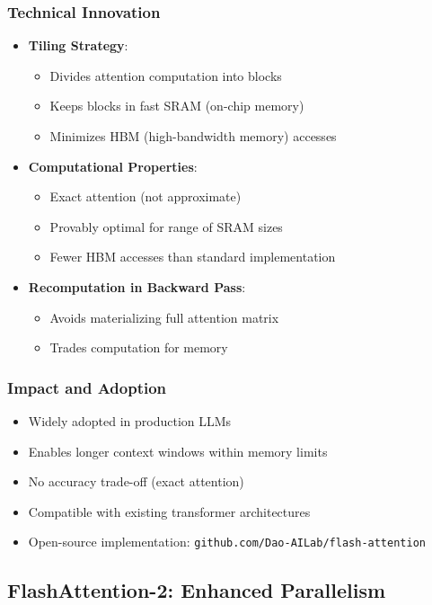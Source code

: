 \documentclass[11pt]{article}
\begin{document}
\subsubsection{Technical Innovation}
\begin{itemize}[leftmargin=*]
    \item \textbf{Tiling Strategy}:
    \begin{itemize}
        \item Divides attention computation into blocks
        \item Keeps blocks in fast SRAM (on-chip memory)
        \item Minimizes HBM (high-bandwidth memory) accesses
    \end{itemize}
    \item \textbf{Computational Properties}:
    \begin{itemize}
        \item Exact attention (not approximate)
        \item Provably optimal for range of SRAM sizes
        \item Fewer HBM accesses than standard implementation
    \end{itemize}
    \item \textbf{Recomputation in Backward Pass}:
    \begin{itemize}
        \item Avoids materializing full attention matrix
        \item Trades computation for memory
    \end{itemize}
\end{itemize}

\subsubsection{Impact and Adoption}
\begin{itemize}[leftmargin=*]
    \item Widely adopted in production LLMs
    \item Enables longer context windows within memory limits
    \item No accuracy trade-off (exact attention)
    \item Compatible with existing transformer architectures
    \item Open-source implementation: \texttt{github.com/Dao-AILab/flash-attention}
\end{itemize}

\subsection{FlashAttention-2: Enhanced Parallelism}
\end{document}
